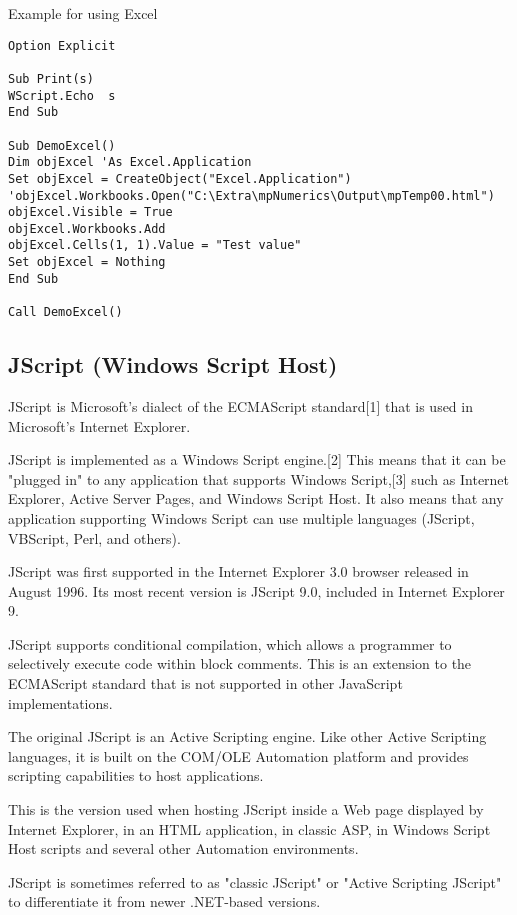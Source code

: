 \vpara
Example for using Excel

\begin{lstlisting}
Option Explicit

Sub Print(s)
WScript.Echo  s
End Sub

Sub DemoExcel()
Dim objExcel 'As Excel.Application
Set objExcel = CreateObject("Excel.Application")
'objExcel.Workbooks.Open("C:\Extra\mpNumerics\Output\mpTemp00.html")
objExcel.Visible = True
objExcel.Workbooks.Add
objExcel.Cells(1, 1).Value = "Test value"
Set objExcel = Nothing
End Sub

Call DemoExcel()
\end{lstlisting}




\newpage
\subsection{JScript (Windows Script Host)}
JScript is Microsoft's dialect of the ECMAScript standard[1] that is used in Microsoft's Internet Explorer.

\vpara
JScript is implemented as a Windows Script engine.[2] This means that it can be "plugged in" to any application that supports Windows Script,[3] such as Internet Explorer, Active Server Pages, and Windows Script Host. It also means that any application supporting Windows Script can use multiple languages (JScript, VBScript, Perl, and others).

\vpara
JScript was first supported in the Internet Explorer 3.0 browser released in August 1996. Its most recent version is JScript 9.0, included in Internet Explorer 9.

\vpara
JScript supports conditional compilation, which allows a programmer to selectively execute code within block comments. This is an extension to the ECMAScript standard that is not supported in other JavaScript implementations.

\vpara
The original JScript is an Active Scripting engine. Like other Active Scripting languages, it is built on the COM/OLE Automation platform and provides scripting capabilities to host applications.

\vpara
This is the version used when hosting JScript inside a Web page displayed by Internet Explorer, in an HTML application, in classic ASP, in Windows Script Host scripts and several other Automation environments.

\vpara
JScript is sometimes referred to as "classic JScript" or "Active Scripting JScript" to differentiate it from newer .NET-based versions.

